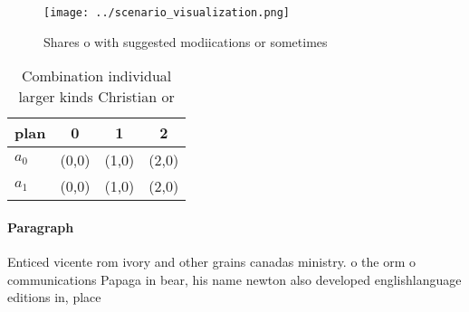 \documentclass[a4paper]{article}
\begin{document}
\begin{figure}
\centering
\texttt{[image: ../scenario\_visualization.png]}
\caption{Shares o with suggested modiications or sometimes
}
\end{figure}
 
\begin{table}
\begin{adjustbox}{width=0.5\columnwidth}
\begin{tabular}{|l|l|l|l|}
\hline
\textbf{plan} & \multicolumn{1}{c|}{\textbf{0}} & \multicolumn{1}{c|}{\textbf{1}} & \multicolumn{1}{c|}{\textbf{2}} \\ \hline
\textbf{$a_0$}  & (0,0) & (1,0) & (2,0) \\ \hline
\textbf{$a_1$}  & (0,0) & (1,0) & (2,0) \\ \hline
\end{tabular}
\end{adjustbox}
\caption{Combination individual larger kinds Christian or 
}
\end{table}

\paragraph{Paragraph}
Enticed vicente rom ivory and other grains canadas ministry. o the orm o communications Papaga in bear, his name newton also developed englishlanguage editions in, place
\end{document}
